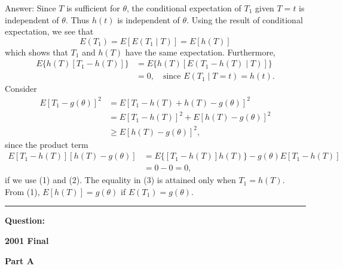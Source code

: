 \documentclass[11pt]{article}
\begin{document}
Answer: Since $T$ is sufficient for $\theta$, the conditional expectation of $T_1$ given $T=t$ is independent of $\theta$. Thus $h(t)$ is independent of $\theta$. Using the result of conditional expectation, we see that
\begin{equation*}
E(T_1)=E[E(T_1\mid T)]=E[h(T)] \tag{1}
\end{equation*}
which shows that $T_1$ and $h(T)$ have the same expectation. Furthermore,
\begin{equation*}
\begin{aligned}
E\{h(T)[T_1-h(T)]\}
&=E\{h(T)[E(T_1-h(T)\mid T)]\} \\
&=0,\quad\text{since }E(T_1\mid T=t)=h(t).
\end{aligned}\tag{2}
\end{equation*}
Consider
\begin{equation*}
\begin{aligned}
E[T_1-g(\theta)]^2
&=E[T_1-h(T)+h(T)-g(\theta)]^2 \\
&=E[T_1-h(T)]^2+E[h(T)-g(\theta)]^2 \\
&\geq E[h(T)-g(\theta)]^2,
\end{aligned}\tag{3}
\end{equation*}
since the product term
\begin{align*}
E[T_1-h(T)][h(T)-g(\theta)]
&=E\{[T_1-h(T)]h(T)\}-g(\theta)E[T_1-h(T)]\\
&=0-0=0,
\end{align*}
if we use (1) and (2). The equality in (3) is attained only when $T_1=h(T)$. From (1), $E[h(T)]=g(\theta)$ if $E(T_1)=g(\theta)$.

\medskip
\hrule
\medskip

\textbf{Question:}

\clearpage

\begin{center}
    {\Large\bfseries 2001 Final}
\end{center}

\vspace{1em}

\begin{center}
\textbf{Part A}
\end{center}
\end{document}
